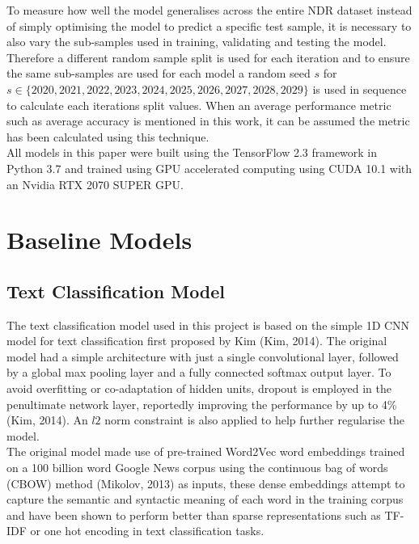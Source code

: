 \documentclass[a4paper,12pt]{article}
\begin{document}
To measure how well the model generalises across the entire NDR dataset instead of simply optimising the model to predict a specific test sample, it is necessary to also vary the sub-samples used in training, validating and testing the model. Therefore a different random sample split is used for each iteration and to ensure the same sub-samples are used for each model a random seed $s$ for $s \in \{2020, 2021, 2022, 2023, 2024, 2025, 2026, 2027, 2028, 2029\}$ is used in sequence to calculate each iterations split values. When an average performance metric such as average accuracy is mentioned in this work, it can be assumed the metric has been calculated using this technique.\\

All models in this paper were built using the TensorFlow 2.3 framework in Python 3.7 and trained using GPU accelerated computing using CUDA 10.1 with an Nvidia RTX 2070 SUPER GPU.

\section{Baseline Models}

\subsection{Text Classification Model}
The text classification model used in this project is based on the simple 1D CNN model for text classification first proposed by Kim (Kim, 2014). The original model had a simple architecture with just a single convolutional layer, followed by a global max pooling layer and a fully connected softmax output layer. To avoid overfitting or co-adaptation of hidden units, dropout is employed in the penultimate network layer, reportedly improving the performance by up to 4\% (Kim, 2014). An $l2$ norm constraint is also applied to help further regularise the model.\\

The original model made use of pre-trained Word2Vec word embeddings trained on a 100 billion word Google News corpus using the continuous bag of words (CBOW) method (Mikolov, 2013) as inputs, these dense embeddings attempt to capture the semantic and syntactic meaning of each word in the training corpus and have been shown to perform better than sparse representations such as TF-IDF or one hot encoding in text classification tasks.\\
\end{document}
